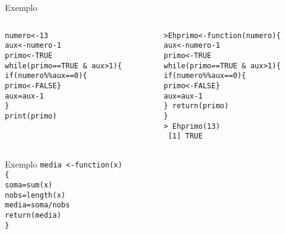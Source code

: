 \documentclass[handout]{beamer}
\begin{document}
\begin{frame}{Exemplo}
  \begin{columns}
    \begin{column}{6cm}
      \texttt{numero<-13\\
aux<-numero-1\\
 primo<-TRUE\\
 while(primo==TRUE \& aux>1)\{\\
 \hspace{30pt}      if(numero\%\%aux==0)\{\\
  \hspace{30pt}\hspace{30pt}     primo<-FALSE\}\\
  \hspace{30pt}     aux=aux-1\\
 \} \\
 print(primo)
 } 
    \end{column}\pause
    \begin{column}{6cm}
      \texttt{>Ehprimo<-function(numero)\{\\
aux<-numero-1\\
 primo<-TRUE\\
 while(primo==TRUE \& aux>1)\{\\
 \hspace{30pt}      if(numero\%\%aux==0)\{\\
  \hspace{30pt}\hspace{30pt}     primo<-FALSE\}\\
  \hspace{30pt}     aux=aux-1\\
 \}
 return(primo)\\
\}\\ \vspace{10pt}
> Ehprimo(13)\\
~[1] TRUE
 } 
    \end{column}
\end{columns}
 
\end{frame}
\begin{frame}{Exemplo}
\texttt{media <-function(x)\\
\hspace{30pt} \{\\
\hspace{30pt} soma=sum(x)\\
\hspace{30pt} nobs=length(x)\\
\hspace{30pt} media=soma/nobs\\
\hspace{30pt} return(media)\\
\hspace{30pt}\}}
  
\end{frame}
\end{document}
